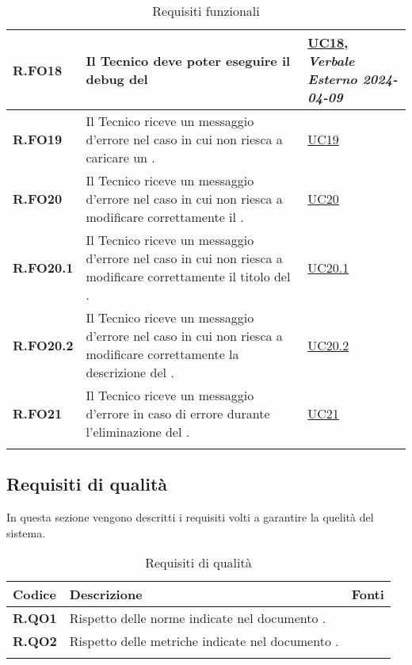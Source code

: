\begin{longtable}{|P{3cm}|P{6,5cm}|>{\arraybackslash}P{4cm}|}
    \hline
    \textbf{R.FO18} & Il Tecnico deve poter eseguire il debug del  &  \hyperref[UC18]{UC18}, \emph{Verbale Esterno 2024-04-09}\\
    \hline
    \textbf{R.FO19} & Il Tecnico riceve un messaggio d'errore nel caso in cui non riesca a caricare un . & \hyperref[UC19]{UC19} \\
    \hline 
    \textbf{R.FO20} & Il Tecnico riceve un messaggio d'errore nel caso in cui non riesca a modificare correttamente il . & \hyperref[UC20]{UC20} \\
    \hline
    \textbf{R.FO20.1} & Il Tecnico riceve un messaggio d'errore nel caso in cui non riesca a modificare correttamente il titolo del . & \hyperref[UC20point1]{UC20.1} \\
    \hline
    \textbf{R.FO20.2} & Il Tecnico riceve un messaggio d'errore nel caso in cui non riesca a modificare correttamente la descrizione del . & \hyperref[UC20point2]{UC20.2} \\
    \hline
    \textbf{R.FO21} & Il Tecnico riceve un messaggio d'errore in caso di errore durante l'eliminazione del . &  \hyperref[21]{UC21}\\
    \hline
\caption{Requisiti funzionali}
\label{requisitifunzionali}
\end{longtable}

\subsection{Requisiti di qualità}
In questa sezione vengono descritti i requisiti volti a garantire la quelità del sistema.

\begin{longtable}{|P{3cm}|P{6,5cm}|>{\arraybackslash}P{4cm}|}
  \hline
  \textbf{Codice} & \textbf{Descrizione} & \textbf{Fonti} \\
  \hline
  \textbf{R.QO1} & Rispetto delle norme indicate nel documento \NdP{}. & \NdP{} \\
  \hline
  \textbf{R.QO2} & Rispetto delle metriche indicate nel documento \PdQ{}. & \NdP{} \\
  \hline
\caption{Requisiti di qualità}
\label{requisitiqualita}
\end{longtable}

